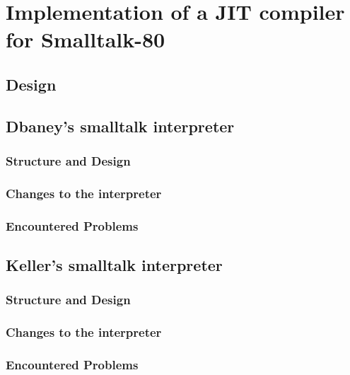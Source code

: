 \chapter{Implementation of a JIT compiler for Smalltalk-80}

\section{Design}

\section{Dbaney's smalltalk interpreter}
\subsection{Structure and Design}
\subsection{Changes to the interpreter}
\subsection{Encountered Problems}


\section{Keller's smalltalk interpreter}
\subsection{Structure and Design}
\subsection{Changes to the interpreter}
\subsection{Encountered Problems}


